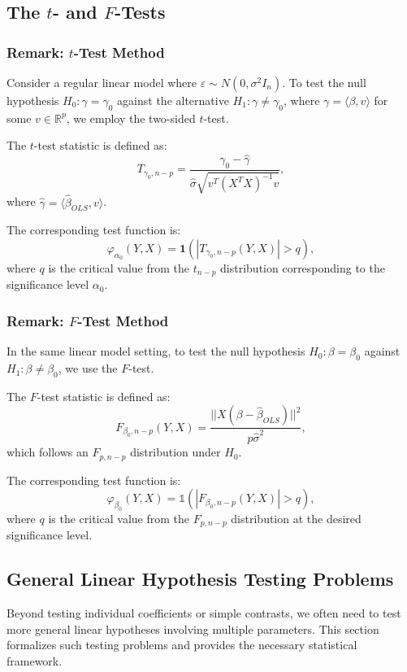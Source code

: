\documentclass[open=any, 11pt,paper=A4]{scrreprt}
\begin{document}
\subsection{The \(t\)- and \(F\)-Tests}

\subsubsection*{Remark: \(t\)-Test Method}

Consider a regular linear model where \(\varepsilon \sim N(0, \sigma^2 I_n)\). To test the null hypothesis \(H_0: \gamma = \gamma_0\) against the alternative \(H_1: \gamma \neq \gamma_0\), where \(\gamma = \langle \beta, v \rangle\) for some \(v \in \mathbb{R}^p\), we employ the two-sided \(t\)-test.

The \(t\)-test statistic is defined as:
\[
T_{\gamma_0, n - p} = \frac{\gamma_0 - \hat{\gamma}}{\hat{\sigma} \sqrt{v^T (X^TX)^{-1} v}},
\]
where \(\hat{\gamma} = \langle \hat{\beta}_{OLS}, v \rangle\).

The corresponding test function is:
\[
\varphi_{\alpha_0}(Y, X) = \mathbf{1} \left( \left| T_{\gamma_0, n - p}(Y, X) \right| > q \right),
\]
where \(q\) is the critical value from the \(t_{n - p}\) distribution corresponding to the significance level \(\alpha_0\).

\subsubsection*{Remark: \(F\)-Test Method}

In the same linear model setting, to test the null hypothesis \(H_0: \beta = \beta_0\) against \(H_1: \beta \neq \beta_0\), we use the \(F\)-test.

The \(F\)-test statistic is defined as:
\[
F_{\beta_0, n - p}(Y, X) = \frac{||X (\beta - \hat{\beta}_{OLS})||^2}{p \hat{\sigma}^2},
\]
which follows an \(F_{p, n - p}\) distribution under \(H_0\).

The corresponding test function is:
\[
\varphi_{\beta_0}(Y, X) = \mathbb{1} \left( |F_{\beta_0, n - p}(Y, X)| > q \right),
\]
where \(q\) is the critical value from the \(F_{p, n - p}\) distribution at the desired significance level.

\subsection{General Linear Hypothesis Testing Problems}

Beyond testing individual coefficients or simple contrasts, we often need to test more general linear hypotheses involving multiple parameters. This section formalizes such testing problems and provides the necessary statistical framework.
\end{document}
